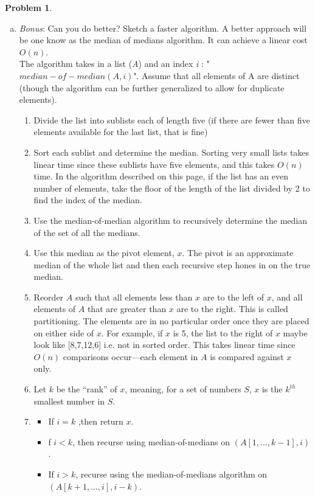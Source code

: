\documentclass{article}
\theoremstyle{definition}
\newtheorem{problem}{Problem}[section]
\begin{document}
\begin{problem}
\begin{enumerate}[a)]
\begin{enumerate}[1)]
            \end{enumerate}
        \item \textit{Bonus}: Can you do better? Sketch a faster algorithm.
            A better approach will be one know as the median of medians algorithm. It can achieve a linear cost $O(n)$.\\
            The algorithm takes in a list (\textit{A}) and an index \textit{i} : "$median-of-median(A,i)$". Assume that all elements of A are distinct (though the algorithm can be further generalized to allow for duplicate elements). 
            \begin{enumerate}[1)]
                \item Divide the list into sublists each of length five (if there are fewer than five elements available for the last list, that is fine)
                \item Sort each sublist and determine the median. Sorting very small lists takes linear time since these sublists have five elements, and this takes $O(n)$ time. In the algorithm described on this page, if the list has an even number of elements, take the floor of the length of the list divided by 2 to find the index of the median. 
                \item Use the median-of-median algorithm to recursively determine the median of the set of all the medians. 
                \item Use this median as the pivot element, $x$. The pivot is an approximate median of the whole list and then each recursive step hones in on the true median. 
                \item Reorder $A$ such that all elements less than $x$ are to the left of $x$, and all elements of $A$ that are greater than $x$ are to the right. This is called partitioning. The elements are in no particular order once they are placed on either side of $x$. For example, if $x$ is 5, the list to the right of $x$ maybe look like [8,7,12,6]  i.e. not in sorted order. This takes linear time since $O(n)$ comparisons occur—each element in $A$ is compared against $x$ only.
                \item Let $k$ be the “rank” of $x$, meaning, for a set of numbers $S$, $x$ is the $k^{th}$ smallest number in $S$. 
                \item 
                \begin{itemize}
                    \item If $i=k$ ,then return $x$. 
                    \item f $i<k$, then recurse using median-of-medians on $(A[1,\ldots,k−1],i)$.
                    \item If $i>k$, recurse using the median-of-medians algorithm on $(A[k+1,\ldots,i],i−k)$.
                \end{itemize} 
            \end{enumerate}
    \end{enumerate}
\end{problem}
\end{document}
